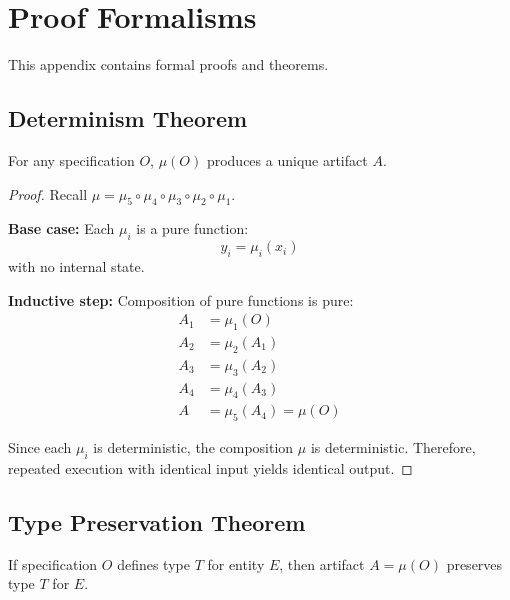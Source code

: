\chapter{Proof Formalisms}

This appendix contains formal proofs and theorems.

\section{Determinism Theorem}

\begin{theorem}[Determinism]
    For any specification \(O\), \(\mu(O)\) produces a unique artifact \(A\).
\end{theorem}

\begin{proof}
    Recall \(\mu = \mu_5 \circ \mu_4 \circ \mu_3 \circ \mu_2 \circ \mu_1\).

    \textbf{Base case:} Each \(\mu_i\) is a pure function:
    \begin{equation}
        y_i = \mu_i(x_i)
    \end{equation}
    with no internal state.

    \textbf{Inductive step:} Composition of pure functions is pure:
    \begin{align}
        A_1 &= \mu_1(O) \\
        A_2 &= \mu_2(A_1) \\
        A_3 &= \mu_3(A_2) \\
        A_4 &= \mu_4(A_3) \\
        A   &= \mu_5(A_4) = \mu(O)
    \end{align}

    Since each \(\mu_i\) is deterministic, the composition \(\mu\) is deterministic. Therefore, repeated execution with identical input yields identical output.
\end{proof}

\section{Type Preservation Theorem}

\begin{theorem}
    If specification \(O\) defines type \(T\) for entity \(E\), then artifact \(A = \mu(O)\) preserves type \(T\) for \(E\).
\end{theorem}


